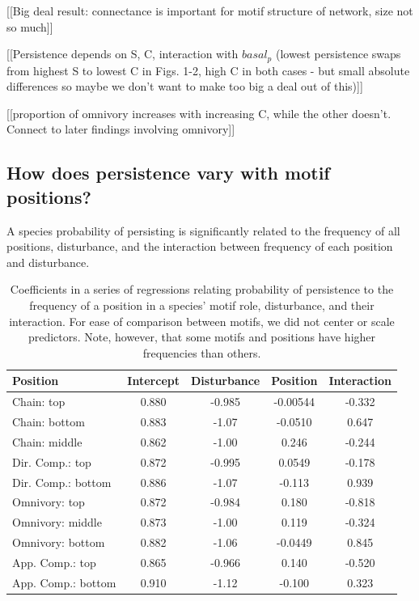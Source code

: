 \documentclass[12pt]{article}
\begin{document}
\begin{spacing}{2.0}
 

\clearpage


    [[Big deal result: connectance is important for motif structure of network, size not so much]]
    

    [[Persistence depends on S, C, interaction with $basal_p$ (lowest persistence swaps from highest S to lowest C in Figs. 1-2, high C in both cases - but small absolute differences so maybe we don't want to make too big a deal out of this)]]
    
    [[proportion of omnivory increases with increasing C, while the other doesn't. Connect to later findings involving omnivory]]



\clearpage

    \subsection*{How does persistence vary with motif positions?}

        A species probability of persisting is significantly related to the frequency of all positions, disturbance, and the interaction between frequency of each position and disturbance.
        \begin{table}[h!]
            \caption{Coefficients in a series of regressions relating probability of persistence to the frequency of a position in a species' motif role, disturbance, and their interaction. For ease of comparison between motifs, we did not center or scale predictors. Note, however, that some motifs and positions have higher frequencies than others.}
            \label{tab:persistence_vs_positions}
            \centering
            \begin{tabular}{l | c c c c}
            Position	& Intercept	& Disturbance	& Position	& Interaction \\
            \hline
            Chain: top	& 0.880 &	-0.985 & -0.00544 & -0.332 \\
            Chain: bottom	& 0.883 &	-1.07 &	-0.0510 &	0.647 \\
            Chain: middle	& 0.862 & -1.00 &	0.246 &	-0.244 \\
            \hline
            Dir. Comp.: top & 0.872 &	-0.995	& 0.0549 &	-0.178 \\
            Dir. Comp.: bottom & 0.886 &	-1.07 &	-0.113 &	0.939 \\
            \hline
            Omnivory: top	& 0.872 &	-0.984 &	0.180 &	-0.818 \\
            Omnivory: middle & 0.873 & -1.00 &	0.119 &	-0.324 \\
            Omnivory: bottom & 0.882 & -1.06 &	-0.0449 &	0.845 \\
            \hline
            App. Comp.: top & 0.865 &	-0.966 &	0.140 &	-0.520 \\
            App. Comp.: bottom & 0.910 &	-1.12 &	-0.100 &	0.323 \\
            \hline
            \end{tabular}
        \end{table}
        

\end{spacing}
\end{document}
